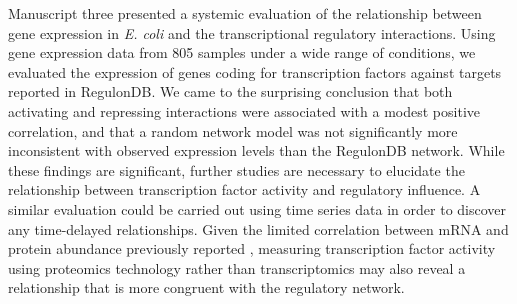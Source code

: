 Manuscript three presented a systemic evaluation of the relationship between gene expression in \emph{E. coli} and the transcriptional regulatory interactions. Using gene expression data from 805 samples under a wide range of conditions, we evaluated the expression of genes coding for transcription factors against targets reported in RegulonDB. We came to the surprising conclusion that both activating and repressing interactions were associated with a modest positive correlation, and that a random network model was not significantly more inconsistent with observed expression levels than the RegulonDB network.
While these findings are significant, further studies are necessary to elucidate the relationship between transcription factor activity and regulatory influence. A similar evaluation could be carried out using time series data in order to discover any time-delayed relationships. Given the limited correlation between mRNA and protein abundance previously reported \cite{Rogers2008,Maier2009,Schwanhaeusser2011,Ghazalpour2011}, measuring transcription factor activity using proteomics technology rather than transcriptomics may also reveal a relationship that is more congruent with the regulatory network.

